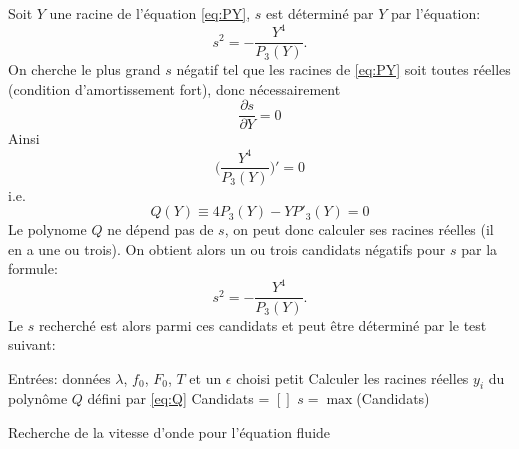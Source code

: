 \documentclass[11pt]{article}
\begin{document}
Soit $Y$ une racine de l'équation \ref{eq:PY}, $s$ est déterminé par $Y$ par l'équation: \begin{equation}
	s^2 = -\frac{Y^4}{P_3(Y)}. \label{eq:sfromY}
\end{equation} 
On cherche le plus grand $s$ négatif tel que les racines de \ref{eq:PY} soit toutes réelles (condition d'amortissement fort), donc nécessairement \begin{equation}
	\frac{\partial s}{\partial Y}=0
\end{equation}
Ainsi \begin{equation}
	\Big(\frac{Y^4}{P_3(Y)}\Big)'=0
\end{equation}
i.e. \begin{equation}
\label{eq:Q}	Q(Y)\equiv4P_3(Y)-YP'_3(Y)=0
\end{equation}
Le polynome $Q$ ne dépend pas de $s$, on peut donc calculer ses racines réelles (il en a une ou trois). 
On obtient alors un ou trois candidats négatifs pour $s$ par la formule: \begin{equation*}
	s^2 = -\frac{Y^4}{P_3(Y)}.
\end{equation*}
Le $s$ recherché est alors parmi ces candidats et peut être déterminé par le test suivant: \\

\begin{algorithm}[H]
\SetAlgoLined
{}
 Entrées: données $\lambda$, $f_0$, $F_0$, $T$ et un $\epsilon$ choisi petit\;
 Calculer les racines réelles $y_i$ du polynôme $Q$ défini par \ref{eq:Q}\; 
 Candidats = $[]$\;
 $s= \max$(Candidats)
 \caption{Recherche de la vitesse d'onde pour l’équation fluide}
\end{algorithm}
 \ifdefined\COMPLETE
\else
\end{document}
